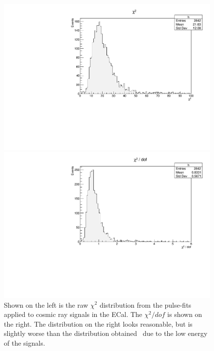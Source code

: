 \documentclass[twoside]{article}
\begin{document}
\begin{figure}[hbt]
\begin{minipage}{0.5\textwidth}
 \includegraphics[width=\textwidth]{pics/chi2.pdf}
\end{minipage}\hfill\begin{minipage}{0.5\textwidth}
 \includegraphics[width=\textwidth]{pics/chi2_dof.pdf}
 \end{minipage}
  \caption{Shown on the left is the raw $\chi^2$ distribution from the pulse-fits applied to cosmic ray signals in the ECal. The $\chi^2/dof$ is shown on the right. The distribution on the right looks reasonable, but is slightly worse than the distribution obtained~\cite{baltzell_ecal_2015} due to the low energy of the signals.}
  \label{fig:chi2}
\end{figure}
\end{document}
